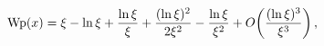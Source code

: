 \[\mathop{\mathrm{Wp}\/}\nolimits\!\left(x\right)=\xi-\mathop{\ln\/}\nolimits\xi%
+\frac{\mathop{\ln\/}\nolimits\xi}{\xi}+\frac{(\mathop{\ln\/}\nolimits\xi)^{2}%
}{2\xi^{2}}-\frac{\mathop{\ln\/}\nolimits\xi}{\xi^{2}}+\mathop{O\/}\nolimits\!%
\left(\frac{(\mathop{\ln\/}\nolimits\xi)^{3}}{\xi^{3}}\right),\]